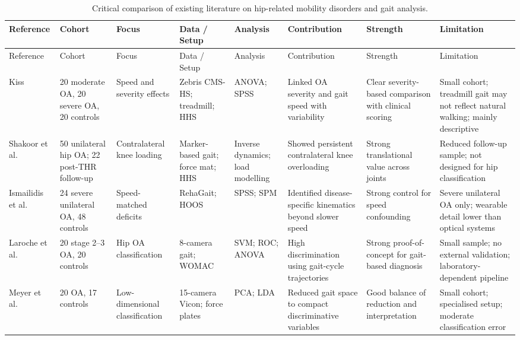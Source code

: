 \documentclass[12pt]{elsarticle}
\begin{document}
{\scriptsize
\setlength{\tabcolsep}{2pt}
\renewcommand{\arraystretch}{1.03}
\begin{longtable}{p{1.9cm} p{1.6cm} p{1.9cm} p{1.9cm} p{1.7cm} p{1.9cm} p{2.0cm} p{3.0cm}}
\caption{Critical comparison of existing literature on hip-related mobility disorders and gait analysis.}
\label{hip_critical_extended_summary} \\
\hline
Reference & Cohort & Focus & Data / Setup & Analysis & Contribution & Strength & Limitation \\
\hline
\endfirsthead

\hline
Reference & Cohort & Focus & Data / Setup & Analysis & Contribution & Strength & Limitation \\
\hline
\endhead

Kiss \cite{kiss2010effect}
& 20 moderate OA, 20 severe OA, 20 controls
& Speed and severity effects
& Zebris CMS-HS; treadmill; HHS
& ANOVA; SPSS
& Linked OA severity and gait speed with variability
& Clear severity-based comparison with clinical scoring
& Small cohort; treadmill gait may not reflect natural walking; mainly descriptive \\
\hline

Shakoor et al. \cite{shakoor2003asymmetric}
& 50 unilateral hip OA; 22 post-THR follow-up
& Contralateral knee loading
& Marker-based gait; force mat; HHS
& Inverse dynamics; load modelling
& Showed persistent contralateral knee overloading
& Strong translational value across joints
& Reduced follow-up sample; not designed for hip classification \\
\hline

Ismailidis et al. \cite{ismailidis2021kinematic}
& 24 severe unilateral OA, 48 controls
& Speed-matched deficits
& RehaGait; HOOS
& SPSS; SPM
& Identified disease-specific kinematics beyond slower speed
& Strong control for speed confounding
& Severe unilateral OA only; wearable detail lower than optical systems \\
\hline

Laroche et al. \cite{laroche2014classification}
& 20 stage 2--3 OA, 20 controls
& Hip OA classification
& 8-camera gait; WOMAC
& SVM; ROC; ANOVA
& High discrimination using gait-cycle trajectories
& Strong proof-of-concept for gait-based diagnosis
& Small sample; no external validation; laboratory-dependent pipeline \\
\hline

Meyer et al. \cite{meyer2015biomechanical}
& 20 OA, 17 controls
& Low-dimensional classification
& 15-camera Vicon; force plates
& PCA; LDA
& Reduced gait space to compact discriminative variables
& Good balance of reduction and interpretation
& Small cohort; specialised setup; moderate classification error \\
\hline


\end{longtable}}
\end{document}
